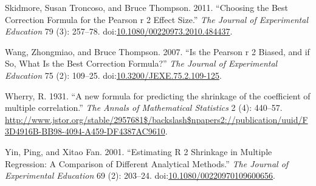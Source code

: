 \documentclass[]{article}
\begin{document}
\hypertarget{ref-Skidmore2011}{}
Skidmore, Susan Troncoso, and Bruce Thompson. 2011. ``Choosing the Best
Correction Formula for the Pearson r 2 Effect Size.'' \emph{The Journal
of Experimental Education} 79 (3): 257--78.
doi:\href{https://doi.org/10.1080/00220973.2010.484437}{10.1080/00220973.2010.484437}.

\hypertarget{ref-Wang2007}{}
Wang, Zhongmiao, and Bruce Thompson. 2007. ``Is the Pearson r 2 Biased,
and if So, What Is the Best Correction Formula?'' \emph{The Journal of
Experimental Education} 75 (2): 109--25.
doi:\href{https://doi.org/10.3200/JEXE.75.2.109-125}{10.3200/JEXE.75.2.109-125}.

\hypertarget{ref-Wherry1931}{}
Wherry, R. 1931. ``A new formula for predicting the shrinkage of the
coefficient of multiple correlation.'' \emph{The Annals of Mathematical
Statistics} 2 (4): 440--57.
\url{http://www.jstor.org/stable/2957681$/backslash$npapers2://publication/uuid/F3D4916B-BB98-4094-A459-DF4387AC9610}.

\hypertarget{ref-Yin2001}{}
Yin, Ping, and Xitao Fan. 2001. ``Estimating R 2 Shrinkage in Multiple
Regression: A Comparison of Different Analytical Methods.'' \emph{The
Journal of Experimental Education} 69 (2): 203--24.
doi:\href{https://doi.org/10.1080/00220970109600656}{10.1080/00220970109600656}.
\end{document}
